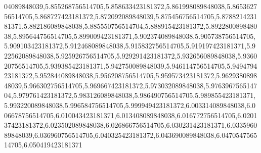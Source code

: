 04089848039,5.855268756514705,5.858633423181372,5.861998089848038,5.865362756514705,5.868727423181372,5.872092089848039,5.875456756514705,5.878821423181371,5.882186089848038,5.885550756514704,5.888915423181372,5.892280089848038,5.895644756514705,5.899009423181371,5.902374089848038,5.905738756514705,5.909103423181372,5.912468089848038,5.915832756514705,5.919197423181371,5.922562089848038,5.925926756514705,5.929291423181372,5.932656089848038,5.936020756514705,5.939385423181371,5.942750089848039,5.946114756514705,5.949479423181372,5.952844089848038,5.956208756514705,5.959573423181372,5.962938089848039,5.966302756514705,5.969667423181372,5.973032089848038,5.976396756514704,5.979761423181372,5.983126089848038,5.986490756514705,5.989855423181371,5.993220089848038,5.996584756514705,5.999949423181372,6.003314089848038,6.006678756514705,6.010043423181371,6.013408089848038,6.016772756514705,6.020137423181372,6.023502089848038,6.026866756514705,6.030231423181371,6.033596089848039,6.036960756514705,6.040325423181372,6.043690089848038,6.047054756514705,6.050419423181371
